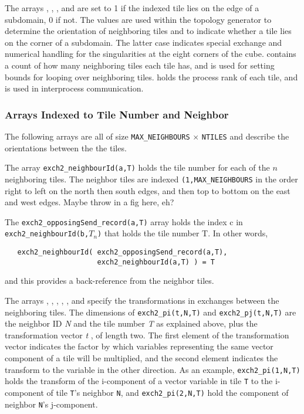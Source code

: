 The arrays ,
,
, and
 are set to 1 if the indexed
tile lies on the edge of a subdomain, 0 if not.  The values are used
within the topology generator to determine the orientation of
neighboring tiles and to indicate whether a tile lies on the corner of
a subdomain.  The latter case indicates special exchange and numerical
handling for the singularities at the eight corners of the cube.
 contains a count of
how many neighboring tiles each tile has, and is used for setting
bounds for looping over neighboring tiles.
 holds the process rank of each
tile, and is used in interprocess communication.

\subsubsection{Arrays Indexed to Tile Number and Neighbor}

The following arrays are all of size \texttt{MAX\_NEIGHBOURS} $\times$
\texttt{NTILES} and describe the orientations between the the tiles.

The array \texttt{exch2\_neighbourId(a,T)} holds the tile number for
each of the $n$ neighboring tiles.  The neighbor tiles are indexed
\texttt{(1,MAX\_NEIGHBOURS} in the order right to left on the north
then south edges, and then top to bottom on the east and west edges.
Maybe throw in a fig here, eh?

The \texttt{exch2\_opposingSend\_record(a,T)} array holds the index c
in \texttt{exch2\_neighbourId(b,$T_{n}$)} that holds the tile number T.
In other words, 
\begin{verbatim}
   exch2_neighbourId( exch2_opposingSend_record(a,T),
                      exch2_neighbourId(a,T) ) = T
\end{verbatim}
and this provides a back-reference from the neighbor tiles.

The arrays ,
, ,
, , and
 specify the transformations in
exchanges between the neighboring tiles.  The dimensions of
\texttt{exch2\_pi(t,N,T)} and \texttt{exch2\_pj(t,N,T)} are the
neighbor ID \textit{N} and the tile number \textit{T} as explained
above, plus the transformation vector {\em t }, of length two.  The
first element of the transformation vector indicates the factor by
which variables representing the same vector component of a tile will
be multiplied, and the second element indicates the transform to the
variable in the other direction.  As an example,
\texttt{exch2\_pi(1,N,T)} holds the transform of the i-component of a
vector variable in tile \texttt{T} to the i-component of tile
\texttt{T}'s neighbor \texttt{N}, and \texttt{exch2\_pi(2,N,T)} hold
the component of neighbor \texttt{N}'s j-component.

